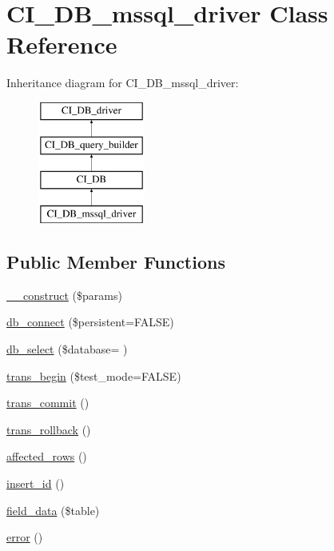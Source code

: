 \hypertarget{class_c_i___d_b__mssql__driver}{}\section{C\+I\+\_\+\+D\+B\+\_\+mssql\+\_\+driver Class Reference}
\label{class_c_i___d_b__mssql__driver}
Inheritance diagram for C\+I\+\_\+\+D\+B\+\_\+mssql\+\_\+driver\+:\begin{figure}[H]
\begin{center}
\leavevmode
\includegraphics[height=4.000000cm]{class_c_i___d_b__mssql__driver}
\end{center}
\end{figure}
\subsection*{Public Member Functions}
\begin{DoxyCompactItemize}
\item 
\hyperlink{class_c_i___d_b__mssql__driver_a9162320adff1a1a4afd7f2372f753a3e}{\+\_\+\+\_\+construct} (\$params)
\item 
\hyperlink{class_c_i___d_b__mssql__driver_a52bf595e79e96cc0a7c907a9b45aeb4d}{db\+\_\+connect} (\$persistent=F\+A\+L\+S\+E)
\item 
\hyperlink{class_c_i___d_b__mssql__driver_a0f25caba4648e1a5ec88fcfe767d5f12}{db\+\_\+select} (\$database= \textquotesingle{}\textquotesingle{})
\item 
\hyperlink{class_c_i___d_b__mssql__driver_a90e153cf190d273336d77cce930587e1}{trans\+\_\+begin} (\$test\+\_\+mode=F\+A\+L\+S\+E)
\item 
\hyperlink{class_c_i___d_b__mssql__driver_af4fbdcdace4aa94a139b64877601fe9b}{trans\+\_\+commit} ()
\item 
\hyperlink{class_c_i___d_b__mssql__driver_a53f76d4dfcd6ac04fb653982442aeef8}{trans\+\_\+rollback} ()
\item 
\hyperlink{class_c_i___d_b__mssql__driver_a77248aaad33eb132c04cc4aa3f4bc8cb}{affected\+\_\+rows} ()
\item 
\hyperlink{class_c_i___d_b__mssql__driver_a933f2cde8dc7f87875e257d0a4902e99}{insert\+\_\+id} ()
\item 
\hyperlink{class_c_i___d_b__mssql__driver_a90355121e1ed009e0efdbd544ab56efa}{field\+\_\+data} (\$table)
\item 
\hyperlink{class_c_i___d_b__mssql__driver_a43b8d30b879d4f09ceb059b02af2bc02}{error} ()
\end{DoxyCompactItemize}
